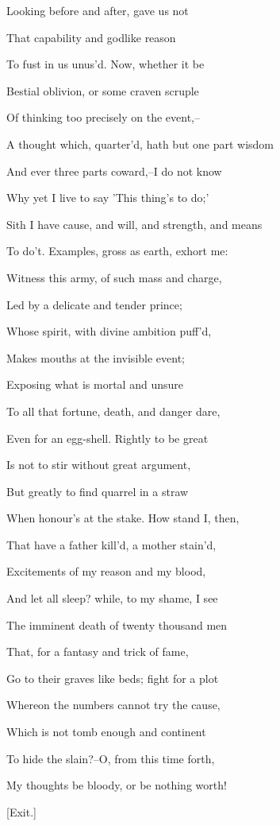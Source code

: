 \documentclass[12pt]{book}
\begin{document}
Looking before and after, gave us not

That capability and godlike reason

To fust in us unus'd. Now, whether it be

Bestial oblivion, or some craven scruple

Of thinking too precisely on the event,--

A thought which, quarter'd, hath but one part wisdom

And ever three parts coward,--I do not know

Why yet I live to say 'This thing's to do;'

Sith I have cause, and will, and strength, and means

To do't. Examples, gross as earth, exhort me:

Witness this army, of such mass and charge,

Led by a delicate and tender prince;

Whose spirit, with divine ambition puff'd,

Makes mouths at the invisible event;

Exposing what is mortal and unsure

To all that fortune, death, and danger dare,

Even for an egg-shell. Rightly to be great

Is not to stir without great argument,

But greatly to find quarrel in a straw

When honour's at the stake. How stand I, then,

That have a father kill'd, a mother stain'd,

Excitements of my reason and my blood,

And let all sleep? while, to my shame, I see

The imminent death of twenty thousand men

That, for a fantasy and trick of fame,

Go to their graves like beds; fight for a plot

Whereon the numbers cannot try the cause,

Which is not tomb enough and continent

To hide the slain?--O, from this time forth,

My thoughts be bloody, or be nothing worth!



[Exit.]
\end{document}
